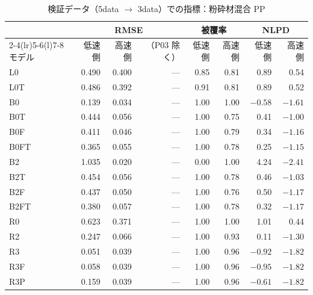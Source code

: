 \documentclass[paper=a4paper,fontsize=10.5pt,line_length=44zw,number_of_lines=38]{jlreq}
\begin{document}
\begin{table}[H]
\caption{検証データ（5data $\to$ 3data）での指標：粉砕材混合 PP}\label{tab:sv_mix}
\begin{tabularx}{\linewidth}{@{}l*{7}{r}@{}}
\toprule
 & \multicolumn{3}{c}{RMSE} & \multicolumn{2}{c}{被覆率} & \multicolumn{2}{c}{NLPD} \\
\cmidrule(lr){2-4}\cmidrule(lr){5-6}\cmidrule(l){7-8}
モデル & 低速側 & 高速側 & （P03 除く） & 低速側 & 高速側 & 低速側 & 高速側 \\
\midrule
L0 & 0.490 & 0.400 & --- & 0.85 & 0.81 & 0.89 & 0.54 \\
L0T & 0.486 & 0.392 & --- & 0.91 & 0.81 & 0.89 & 0.52 \\
B0 & 0.139 & 0.034 & --- & 1.00 & 1.00 & $-0.58$ & $-1.61$ \\
B0T & 0.444 & 0.056 & --- & 1.00 & 0.75 & 0.41 & $-1.00$ \\
B0F & 0.411 & 0.046 & --- & 1.00 & 0.79 & 0.34 & $-1.16$ \\
B0FT & 0.365 & 0.055 & --- & 1.00 & 0.78 & 0.25 & $-1.15$ \\
B2 & 1.035 & 0.020 & --- & 0.00 & 1.00 & 4.24 & $-2.41$ \\
B2T & 0.454 & 0.056 & --- & 1.00 & 0.78 & 0.46 & $-1.03$ \\
B2F & 0.437 & 0.050 & --- & 1.00 & 0.76 & 0.50 & $-1.17$ \\
B2FT & 0.380 & 0.057 & --- & 1.00 & 0.78 & 0.32 & $-1.17$ \\
R0 & 0.623 & 0.371 & --- & 1.00 & 1.00 & 1.01 & 0.44 \\
R2 & 0.247 & 0.066 & --- & 1.00 & 0.93 & 0.11 & $-1.30$ \\
R3 & 0.051 & 0.039 & --- & 1.00 & 0.96 & $-0.92$ & $-1.82$ \\
R3F & 0.058 & 0.039 & --- & 1.00 & 0.96 & $-0.95$ & $-1.82$ \\
R3P & 0.159 & 0.039 & --- & 1.00 & 0.96 & $-0.61$ & $-1.82$ \\
\bottomrule
\end{tabularx}
\end{table}
\end{document}
